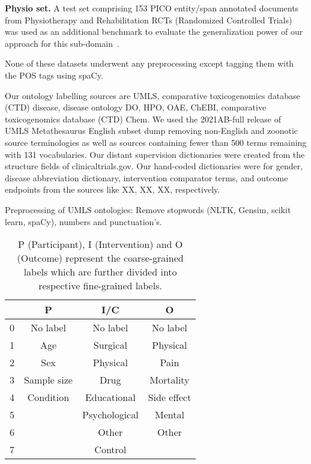 \documentclass[10.7pt,]{article}
\begin{document}
\textbf{Physio set.} A test set comprising 153 PICO entity/span annotated documents from Physiotherapy and Rehabilitation RCTs (Randomized Controlled Trials) was used as an additional benchmark to evaluate the generalization power of our approach for this sub-domain~\cite{dhrangadhariya2021end}.

None of these datasets underwent any preprocessing except tagging them with the POS tags using spaCy.

Our ontology labelling sources are UMLS, comparative toxicogenomics database (CTD) disease, disease ontology DO, HPO, OAE, ChEBI,  comparative toxicogenomics database (CTD) Chem.
We used the 2021AB-full release of UMLS Metathesaurus English subset dump removing non-English and zoonotic source terminologies as well as sources containing fewer than 500 terms remaining with 131 vocabularies.
Our distant supervision dictionaries were created from the structure fields of clinicaltrials.gov.
Our hand-coded dictionaries were for gender, disease abbreviation dictionary, intervention comparator terms, and outcome endpoints from the sources like XX, XX, XX, respectively.

Preprocessing of UMLS ontologies: Remove stopwords (NLTK, Gensim, scikit learn, spaCy), numbers and punctuation's.



\begin{table}[h!]
\begin{center}
\begin{tabular}{| c | c | c | c |} 
\hline
 & P & I/C & O \\ 
\hline
0 & No label & No label & No label \\ 
1 & Age & Surgical & Physical \\ 
2 & Sex & Physical & Pain \\
3 & Sample size & Drug & Mortality \\
4 & Condition & Educational & Side effect \\
5 &  & Psychological & Mental \\
6 &  & Other & Other \\
7 &  & Control &  \\
\hline
\end{tabular}
\caption{P (Participant), I (Intervention) and O (Outcome) represent the coarse-grained labels which are further divided into respective fine-grained labels.}
\label{table:coarsefineconcept}
\end{center}
\end{table}
%
%
%
\end{document}
